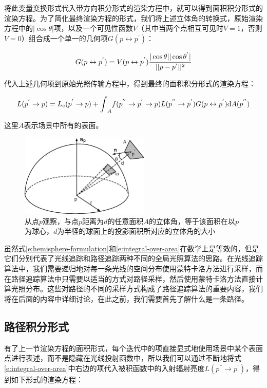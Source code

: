 将此变量变换形式代入带方向积分形式的渲染方程中，就可以得到面积积分形式的渲染方程。为了简化最终渲染方程的形式，我们将上述立体角的转换式，原始渲染方程中的$|\cos\theta|$项，以及一个可见性函数$V$（其中当两个点相互可见时$V=1$，否则$V=0$）组合成一个单一的几何项$G(p\leftrightarrow p^{'})$：

\begin{equation}
	G(p\leftrightarrow p^{'})=V(p\leftrightarrow p^{'}) \cfrac{|\cos\theta||\cos\theta^{'}|}{||p-p^{'}||^2}
\end{equation} 

\noindent 代入上述几何项到原始光照传输方程中，得到最终的面积积分形式的渲染方程：

\begin{equation}\label{e:integral-over-area}
	L(p^{'}\to p)=L_e(p^{'}\to p)+{\rm \int}_A f(p^{''}\to p^{'}\to p)L(p^{''}\to p^{'})G(p\leftrightarrow p^{'}){\rm d}A(p^{''})
\end{equation}

\noindent 这里$A$表示场景中所有的表面。

\begin{figure}
	\sidecaption
	\includegraphics[width=0.55\textwidth]{figures/pt/solid-to-area}
	\caption{从点$p$观察，与点$p$距离为$d$的任意面积$A$的立体角，等于该面积在以$p$为球心，$d$为半径的球面上的投影面积所对应的立体角的大小}
	\label{f:pt-solid-to-area}
\end{figure}

虽然式\ref{e:hemisphere-formulation}和\ref{e:integral-over-area}在数学上是等效的，但是它们分别代表了光线追踪和路径追踪两种不同的全局光照算法的思路。在光线追踪算法中，我们需要递归地对每一条光线的空间分布使用蒙特卡洛方法进行采样，而在路径追踪算法中只需要以适当的方式对路径采样，然后使用蒙特卡洛方法直接计算光照分布。这些对路径的不同的采样方式构成了路径追踪算法的重要内容，我们将在后面的内容中详细讨论，在此之前，我们需要首先了解什么是一条路径。






\subsection{路径积分形式}
有了上一节渲染方程的面积形式，每个迭代中的项直接显式地使用场景中某个表面点进行表述，而不是隐藏在光线投射函数中，所以我们可以通过不断地将式\ref{e:integral-over-area}中右边的项代入被积函数中的入射辐射亮度$L(p^{''}\to p^{'})$，得到如下形式的渲染方程：

